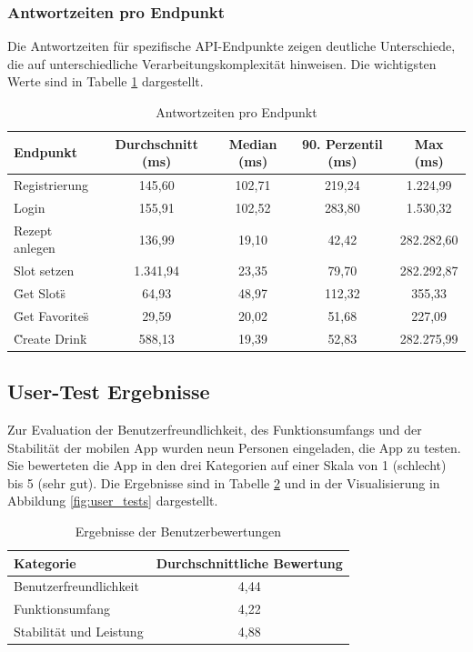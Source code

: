 \subsubsection*{Antwortzeiten pro Endpunkt}

Die Antwortzeiten für spezifische API-Endpunkte zeigen deutliche Unterschiede, die auf unterschiedliche Verarbeitungskomplexität hinweisen. Die wichtigsten Werte sind in Tabelle \ref{tab:response_times} dargestellt.

\begin{table}[h!]
    \centering
    \begin{tabular}{|l|c|c|c|c|}
        \hline
        \textbf{Endpunkt} & \textbf{Durchschnitt (ms)} & \textbf{Median (ms)} & \textbf{90. Perzentil (ms)} & \textbf{Max (ms)} \\
        \hline
        Registrierung & 145,60 & 102,71 & 219,24 & 1.224,99 \\
        Login & 155,91 & 102,52 & 283,80 & 1.530,32 \\
        Rezept anlegen & 136,99 & 19,10 & 42,42 & 282.282,60 \\
        Slot setzen & 1.341,94 & 23,35 & 79,70 & 282.292,87 \\
        \"Get Slots\" & 64,93 & 48,97 & 112,32 & 355,33 \\
        \"Get Favorites\" & 29,59 & 20,02 & 51,68 & 227,09 \\
        \"Create Drink\" & 588,13 & 19,39 & 52,83 & 282.275,99 \\
        \hline
    \end{tabular}
    \caption{Antwortzeiten pro Endpunkt}
    \label{tab:response_times}
\end{table}

\subsection{User-Test Ergebnisse}

Zur Evaluation der Benutzerfreundlichkeit, des Funktionsumfangs und der Stabilität der mobilen App wurden neun Personen eingeladen, die App zu testen. Sie bewerteten die App in den drei Kategorien auf einer Skala von 1 (schlecht) bis 5 (sehr gut). Die Ergebnisse sind in Tabelle \ref{tab:user_tests} und in der Visualisierung in Abbildung \ref{fig:user_tests} dargestellt.

\begin{table}[h!]
    \centering
    \begin{tabular}{|l|c|}
        \hline
        \textbf{Kategorie} & \textbf{Durchschnittliche Bewertung} \\
        \hline
        Benutzerfreundlichkeit & 4,44 \\
        Funktionsumfang & 4,22 \\
        Stabilität und Leistung & 4,88 \\
        \hline
    \end{tabular}
    \caption{Ergebnisse der Benutzerbewertungen}
    \label{tab:user_tests}
\end{table}

